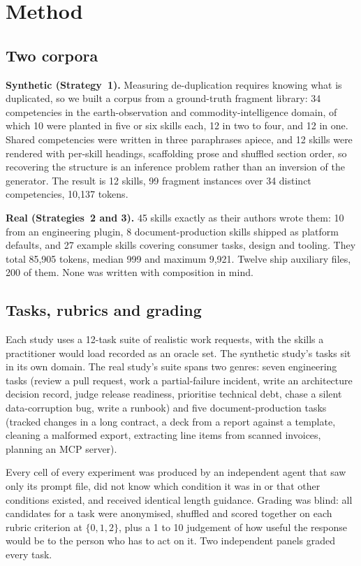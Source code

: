 \documentclass[11pt]{article}
\begin{document}
\section{Method}
\label{sec:method}

\subsection{Two corpora}

\textbf{Synthetic (Strategy~1).} Measuring de-duplication requires knowing what is duplicated, so we
built a corpus from a ground-truth fragment library: 34 competencies in the earth-observation and
commodity-intelligence domain, of which 10 were planted in five or six skills each, 12 in two to
four, and 12 in one. Shared competencies were written in three paraphrases apiece, and 12 skills
were rendered with per-skill headings, scaffolding prose and shuffled section order, so recovering
the structure is an inference problem rather than an inversion of the generator. The result is 12
skills, 99 fragment instances over 34 distinct competencies, 10,137 tokens.

\textbf{Real (Strategies~2 and 3).} 45 skills exactly as their authors wrote them: 10 from an engineering plugin, 8
document-production skills shipped as platform defaults, and 27 example skills covering consumer
tasks, design and tooling. They total 85,905 tokens, median 999 and maximum 9,921. Twelve ship
auxiliary files, 200 of them. None was written with composition in mind.

\subsection{Tasks, rubrics and grading}

Each study uses a 12-task suite of realistic work requests, with the skills a practitioner would
load recorded as an oracle set. The synthetic study's tasks sit in its own domain. The real study's
suite spans two genres: seven engineering tasks (review a pull request, work a partial-failure
incident, write an architecture decision record, judge release readiness, prioritise technical debt,
chase a silent data-corruption bug, write a runbook) and five document-production tasks (tracked
changes in a long contract, a deck from a report against a template, cleaning a malformed export,
extracting line items from scanned invoices, planning an MCP server).

Every cell of every experiment was produced by an independent agent that saw only its prompt file,
did not know which condition it was in or that other conditions existed, and received identical
length guidance. Grading was blind: all candidates for a task were anonymised, shuffled and scored
together on each rubric criterion at $\{0, 1, 2\}$, plus a 1 to 10 judgement of how useful the
response would be to the person who has to act on it. Two independent panels graded every task.
\end{document}
